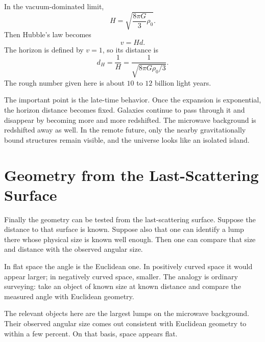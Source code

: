 In the vacuum-dominated limit,
\begin{equation}
H=\sqrt{\frac{8\pi G}{3}\rho_0}.
\end{equation}
Then Hubble's law becomes
\begin{equation}
v=Hd.
\end{equation}
The horizon is defined by \(v=1\), so its distance is
\begin{equation}
d_H=\frac{1}{H}
=
\frac{1}{\sqrt{8\pi G\rho_0/3}}.
\end{equation}
The rough number given here is about \(10\) to \(12\) billion light years.

The important point is the late-time behavior. Once the expansion is exponential, the horizon distance becomes fixed. Galaxies continue to pass through it and disappear by becoming more and more redshifted. The microwave background is redshifted away as well. In the remote future, only the nearby gravitationally bound structures remain visible, and the universe looks like an isolated island.

\section{Geometry from the Last-Scattering Surface}

Finally the geometry can be tested from the last-scattering surface. Suppose the distance to that surface is known. Suppose also that one can identify a lump there whose physical size is known well enough. Then one can compare that size and distance with the observed angular size.

In flat space the angle is the Euclidean one. In positively curved space it would appear larger; in negatively curved space, smaller. The analogy is ordinary surveying: take an object of known size at known distance and compare the measured angle with Euclidean geometry.

\begin{classroomqa}
\end{classroomqa}

The relevant objects here are the largest lumps on the microwave background. Their observed angular size comes out consistent with Euclidean geometry to within a few percent. On that basis, space appears flat.

